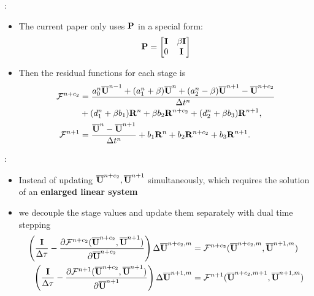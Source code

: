 \documentclass[aspectratio=169,serif]{beamer} %
\begin{document}
\begin{frame}{\secname: \subsecname}
  \begin{itemize}
    \item The current paper only uses $\mathbf{P}$ in a special form:
          \begin{equation}
            \mathbf{P} = \begin{bmatrix}
              \mathbf{I} & \beta\mathbf{I} \\
              0    & \mathbf{I}
            \end{bmatrix}
            \label{eq:specialP}
          \end{equation}
    \item Then the residual functions for each stage is
          \begin{equation}
            \begin{aligned}
              \mathcal{F}^{n+c_2} & =
              \frac{a^n_0\overline{\mathbf{U}}^{n - 1} +
                (a^n_1+\beta)\overline{\mathbf{U}}^{n} +
                (a^n_2-\beta)\overline{\mathbf{U}}^{n + 1} - \overline{\mathbf{U}}^{n+c_2}}{{\Delta} t^n}
              \\ & +
              (d^n_1 + \beta b_1)\mathbf{R}^{n} +
              \beta b_2 \mathbf{R}^{n+c_2} +
              (d^n_2 + \beta b_3)\mathbf{R}^{n + 1},                             \\
              \mathcal{F}^{n+1}   & =    \frac{\overline{\mathbf{U}}^{n} - \overline{\mathbf{U}}^{n+1}}{{\Delta} t^n}  +
              b_1 \mathbf{R}^n +
              b_2 \mathbf{R}^{n+c_2} +
              b_3 \mathbf{R}^{n+1}.
            \end{aligned}
          \end{equation}
  \end{itemize}
\end{frame}

\begin{frame}{\secname: \subsecname}
  \begin{itemize}
    \item Instead of updating $\overline{\mathbf{U}}^{n+c_2}, \overline{\mathbf{U}}^{n+1}$ simultaneously,
          which requires the solution of an {\bf enlarged linear system}
    \item we decouple the stage values and update them separately with dual time stepping
          \begin{equation}
            \begin{aligned}
              \left(\frac{\eye}{\inc\tau} -
              \partialderivative{\FF^{n+c_2}(\uu^{n+c_2}, \uu^{n+1})}{\uu^{n+c_2}}  \right)
              \inc\uu^{n+c_2,m} & = \FF^{n+c_2}(\uu^{n+c_2,m}, \uu^{n+1,m}) \\
              \left(\frac{\eye}{\inc\tau} -
              \partialderivative{\FF^{n+1}(\uu^{n+c_2}, \uu^{n+1})}{\uu^{n+1}}  \right)
              \inc\uu^{n+1,m}   & = \FF^{n+1}(\uu^{n+c_2,m+1}, \uu^{n+1,m}) \\
            \end{aligned}
            \label{eq:DITRSDS}
          \end{equation}
  \end{itemize}
\end{frame}
\end{document}
